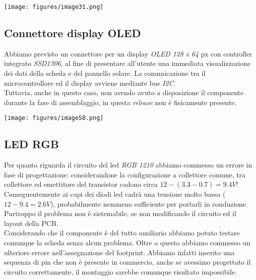 \begin{center}
\texttt{[image: figures/image31.png]}
\captionsetup{type=figure}
\end{center}

\hypertarget{connettore-display-oled}{%
\subsection{\texorpdfstring{Connettore display OLED}{Connettore display OLED }}\label{connettore-display-oled}}

Abbiamo previsto un connettore per un display \emph{OLED 128 x 64} px con
controller integrato \emph{SSD1306}, al fine di presentare all'utente una
immediata visualizzazione dei dati della scheda e del pannello solare. La comunicazione tra il microcontrollore ed il display avviene mediante bus \textit{I2C}. \\
Tuttavia, anche in questo caso, non avendo avuto a disposizione il componente durante la fase
di assemblaggio, in questa \textit{release} non è fisicamente presente.

\begin{center}
\texttt{[image: figures/image58.png]}
\captionsetup{type=figure}
\end{center}

\hypertarget{led-rgb}{%
\subsection{\texorpdfstring{LED RGB}{LED RGB}}\label{led-rgb}}

Per quanto riguarda il circuito del led \emph{RGB 1210} abbiamo commesso
un errore in fase di progettazione: considerandone la configurazione a collettore comune, tra
collettore ed emettitore del transistor cadono circa
$12-(3.3-0.7)=9.4V$!\\
Conseguentemente ai capi dei diodi led cadrà una tensione molto bassa ($12-9.4=2.6V$),
probabilmente nemmeno sufficiente per portarli in conduzione.\\
Purtroppo il problema non è sistemabile, se non modificando il circuito
ed il layout della PCB.\\
Considerando che il componente è del tutto ausiliario abbiamo potuto
testare comunque la scheda senza alcun problema.
Oltre a questo abbiamo commesso un ulteriore errore nell'assegnazione del footprint. 
Abbiamo infatti inserito una sequenza di pin che non è presente in commercio, anche se avessimo progettato il circuito 
correttamente, il montaggio sarebbe comunque risultato impossibile.

